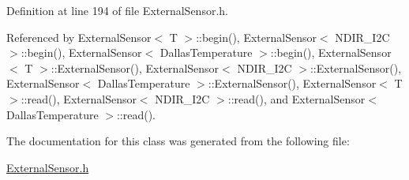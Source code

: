 Definition at line 194 of file External\+Sensor.\+h.



Referenced by External\+Sensor$<$ T $>$\+::begin(), External\+Sensor$<$ N\+D\+I\+R\+\_\+\+I2\+C $>$\+::begin(), External\+Sensor$<$ Dallas\+Temperature $>$\+::begin(), External\+Sensor$<$ T $>$\+::\+External\+Sensor(), External\+Sensor$<$ N\+D\+I\+R\+\_\+\+I2\+C $>$\+::\+External\+Sensor(), External\+Sensor$<$ Dallas\+Temperature $>$\+::\+External\+Sensor(), External\+Sensor$<$ T $>$\+::read(), External\+Sensor$<$ N\+D\+I\+R\+\_\+\+I2\+C $>$\+::read(), and External\+Sensor$<$ Dallas\+Temperature $>$\+::read().



The documentation for this class was generated from the following file\+:\begin{DoxyCompactItemize}
\item 
\hyperlink{_external_sensor_8h}{External\+Sensor.\+h}\end{DoxyCompactItemize}
